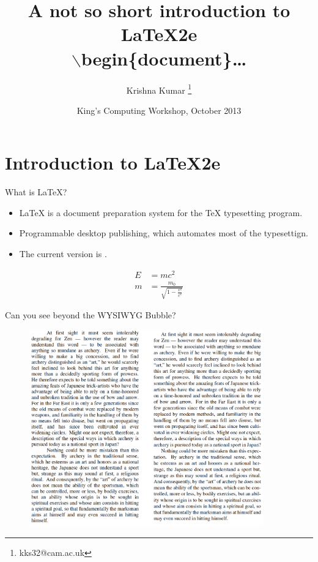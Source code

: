 \documentclass[10pt,xcolor=table]{beamer}
\title [\LaTeX for Beginners]
{A not so short introduction to \LaTeX2e \\ $\backslash$begin\{document\}\dots}
\author[Krishna Kumar] %
{Krishna Kumar \inst{*}\thanks{kks32@cam.ac.uk} } %
\institute[ University of Cambridge ] %
{
  \inst{1}%
King's College\\ University of Cambridge}
\date[King's Computing Workshop 2013] %
{King's Computing Workshop, October 2013}
\begin{document}
\begin{frame}
  \titlepage
\end{frame}

\section{Introduction to \LaTeX2e}
\begin{frame}{What is \LaTeX?}
\begin{itemize}
\item \LaTeX{} is a document preparation system for the \TeX{} typesetting program. 

\item Programmable desktop publishing, which automates most of the typesettign.

\item The current version is \LaTeXe.
\end{itemize}
\begin{align}
    E &= mc^2                              \\
    m &= \frac{m_0}{\sqrt{1-\frac{v^2}{c^2}}}
\end{align}
\end{frame}


\begin{frame}{Can you see beyond the WYSIWYG Bubble?}
\begin{figure}
\includegraphics[width=0.9\textwidth]{figs/LaTeX_Word.png}
\end{figure}
\end{frame}
\end{document}
